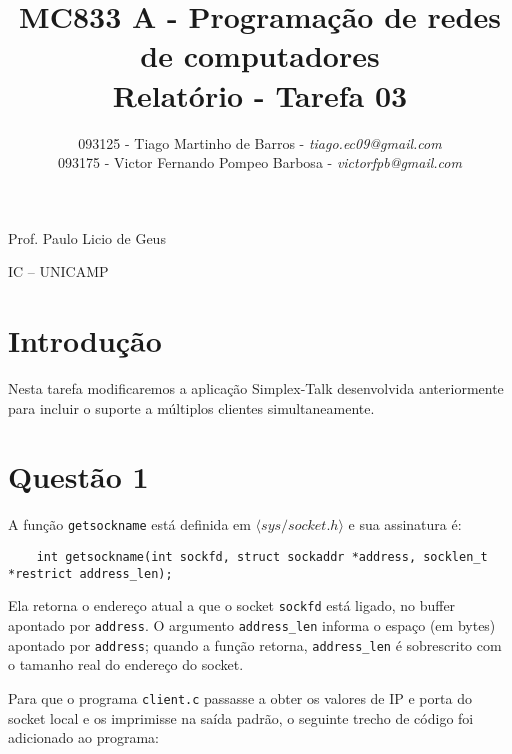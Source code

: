 \documentclass[a4paper,10pt]{article}
\begin{document}


\title{MC833 A - Programação de redes de computadores\\
Relatório - Tarefa 03}

\author {   093125 - Tiago Martinho de Barros - \textit{tiago.ec09@gmail.com}\\
            093175 - Victor Fernando Pompeo Barbosa - \textit{victorfpb@gmail.com}}


\maketitle

\centerline{Prof. Paulo Licio de Geus}
\centerline{IC -- UNICAMP}

\vspace{2cm}
\tableofcontents
    
\newpage
\section{Introdução}
\hspace{14pt}

    Nesta tarefa modificaremos a aplicação Simplex-Talk desenvolvida anteriormente para incluir o suporte a múltiplos clientes simultaneamente.

\section{Questão 1}
A função {\tt getsockname} está definida em $\langle sys/socket.h \rangle$ e sua assinatura é:
    \begin{lstlisting}
    int getsockname(int sockfd, struct sockaddr *address, socklen_t *restrict address_len);
    \end{lstlisting}

Ela retorna o endereço atual a que o socket {\tt sockfd} está ligado, no buffer apontado por {\tt address}. O argumento {\tt address\_len} informa o espaço (em bytes) apontado por {\tt address}; quando a função retorna, {\tt address\_len} é sobrescrito com o tamanho real do endereço do socket.

Para que o programa {\tt client.c} passasse a obter os valores de IP e porta do socket local e os imprimisse na saída padrão, o seguinte trecho de código foi adicionado ao programa:
\end{document}
